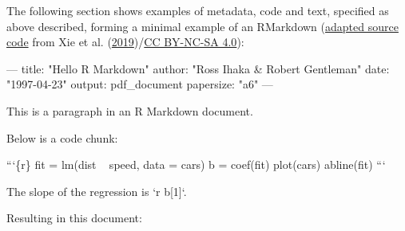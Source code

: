 \documentclass[12pt,a4paper,]{article}
\newenvironment{Shaded}{\begin{snugshade}}{\end{snugshade}}
\newcommand{\AttributeTok}[1]{\textcolor[rgb]{0.77,0.63,0.00}{#1}}
\newcommand{\BaseNTok}[1]{\textcolor[rgb]{0.00,0.00,0.81}{#1}}
\newcommand{\FunctionTok}[1]{\textcolor[rgb]{0.00,0.00,0.00}{#1}}
\newcommand{\NormalTok}[1]{#1}
\newcommand{\OtherTok}[1]{\textcolor[rgb]{0.56,0.35,0.01}{#1}}
\newcommand{\StringTok}[1]{\textcolor[rgb]{0.31,0.60,0.02}{#1}}
\begin{document}
The following section shows examples of metadata, code and text, specified as above described, forming a minimal example of an RMarkdown (\href{https://github.com/rstudio/rmarkdown-book/blob/a10b33d47a2b223a8ef643c245d45e4dfc7091b8/02-basics.Rmd\#L15-L39}{adapted source code} from Xie et al. (\protect\hyperlink{ref-xieMarkdownDefinitiveGuide2019}{2019})/\href{https://creativecommons.org/licenses/by-nc-sa/4.0/}{CC BY-NC-SA 4.0}):

\begin{Shaded}
\begin{Highlighting}[]
\OtherTok{---}
\FunctionTok{title:}\AttributeTok{ }\StringTok{"Hello R Markdown"}
\FunctionTok{author:}\AttributeTok{ }\StringTok{"Ross Ihaka & Robert Gentleman"}
\FunctionTok{date:}\AttributeTok{ }\StringTok{"1997-04-23"}
\FunctionTok{output:}\AttributeTok{ pdf_document}
\FunctionTok{papersize:}\AttributeTok{ }\StringTok{"a6"}
\OtherTok{---}
\end{Highlighting}
\end{Shaded}

\begin{Shaded}
\begin{Highlighting}[]
\NormalTok{This is a paragraph in an R Markdown document.}

\NormalTok{Below is a code chunk:}

\BaseNTok{```\{r\}}
\BaseNTok{fit = lm(dist ~ speed, data = cars)}
\BaseNTok{b   = coef(fit)}
\BaseNTok{plot(cars)}
\BaseNTok{abline(fit)}
\BaseNTok{```}

\NormalTok{The slope of the regression is }\BaseNTok{`r b[1]`}\NormalTok{.}
\end{Highlighting}
\end{Shaded}

Resulting in this document:
\end{document}
